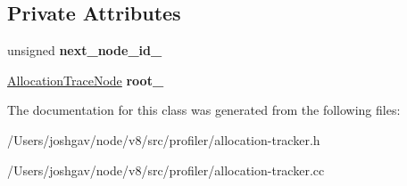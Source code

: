 \subsection*{Private Attributes}
\begin{DoxyCompactItemize}
\item 
unsigned {\bfseries next\+\_\+node\+\_\+id\+\_\+}\hypertarget{classv8_1_1internal_1_1_allocation_trace_tree_ae9d3215ae36599a252b482a526a19cae}{}\label{classv8_1_1internal_1_1_allocation_trace_tree_ae9d3215ae36599a252b482a526a19cae}

\item 
\hyperlink{classv8_1_1internal_1_1_allocation_trace_node}{Allocation\+Trace\+Node} {\bfseries root\+\_\+}\hypertarget{classv8_1_1internal_1_1_allocation_trace_tree_a4a53c39a0297e768c5725c8e1c63503d}{}\label{classv8_1_1internal_1_1_allocation_trace_tree_a4a53c39a0297e768c5725c8e1c63503d}

\end{DoxyCompactItemize}


The documentation for this class was generated from the following files\+:\begin{DoxyCompactItemize}
\item 
/\+Users/joshgav/node/v8/src/profiler/allocation-\/tracker.\+h\item 
/\+Users/joshgav/node/v8/src/profiler/allocation-\/tracker.\+cc\end{DoxyCompactItemize}
